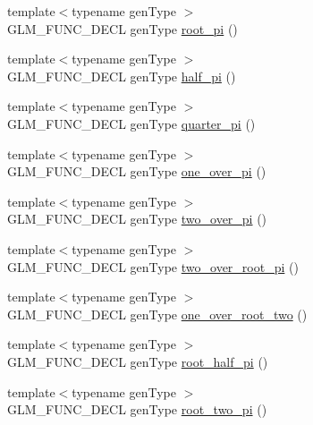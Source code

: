 \begin{DoxyCompactItemize}
\item 
{\footnotesize template$<$typename gen\+Type $>$ }\\G\+L\+M\+\_\+\+F\+U\+N\+C\+\_\+\+D\+E\+CL gen\+Type \hyperlink{group__gtc__constants_ga1cfeb345f34f72697d14f4db8d5d4c6c}{root\+\_\+pi} ()
\item 
{\footnotesize template$<$typename gen\+Type $>$ }\\G\+L\+M\+\_\+\+F\+U\+N\+C\+\_\+\+D\+E\+CL gen\+Type \hyperlink{group__gtc__constants_ga7f7a1050729f3b03b1873a06ba4a472f}{half\+\_\+pi} ()
\item 
{\footnotesize template$<$typename gen\+Type $>$ }\\G\+L\+M\+\_\+\+F\+U\+N\+C\+\_\+\+D\+E\+CL gen\+Type \hyperlink{group__gtc__constants_ga0148d757b4bfda4d86251b8d1ea1dad3}{quarter\+\_\+pi} ()
\item 
{\footnotesize template$<$typename gen\+Type $>$ }\\G\+L\+M\+\_\+\+F\+U\+N\+C\+\_\+\+D\+E\+CL gen\+Type \hyperlink{group__gtc__constants_ga9ba09a027db6d4f4e259b01cf5d6c178}{one\+\_\+over\+\_\+pi} ()
\item 
{\footnotesize template$<$typename gen\+Type $>$ }\\G\+L\+M\+\_\+\+F\+U\+N\+C\+\_\+\+D\+E\+CL gen\+Type \hyperlink{group__gtc__constants_ga85729d38c47351686e8659f80447a7ea}{two\+\_\+over\+\_\+pi} ()
\item 
{\footnotesize template$<$typename gen\+Type $>$ }\\G\+L\+M\+\_\+\+F\+U\+N\+C\+\_\+\+D\+E\+CL gen\+Type \hyperlink{group__gtc__constants_ga767e539c20585bf60aa63595b0f0b259}{two\+\_\+over\+\_\+root\+\_\+pi} ()
\item 
{\footnotesize template$<$typename gen\+Type $>$ }\\G\+L\+M\+\_\+\+F\+U\+N\+C\+\_\+\+D\+E\+CL gen\+Type \hyperlink{group__gtc__constants_gac1a9b3248357fd9e9b740bed90e0b1b7}{one\+\_\+over\+\_\+root\+\_\+two} ()
\item 
{\footnotesize template$<$typename gen\+Type $>$ }\\G\+L\+M\+\_\+\+F\+U\+N\+C\+\_\+\+D\+E\+CL gen\+Type \hyperlink{group__gtc__constants_gaec5af85e2148c118aad7e797430fdeb0}{root\+\_\+half\+\_\+pi} ()
\item 
{\footnotesize template$<$typename gen\+Type $>$ }\\G\+L\+M\+\_\+\+F\+U\+N\+C\+\_\+\+D\+E\+CL gen\+Type \hyperlink{group__gtc__constants_gae991b4d39c57b57990054eec3677597c}{root\+\_\+two\+\_\+pi} ()
\item 

\end{DoxyCompactItemize}
